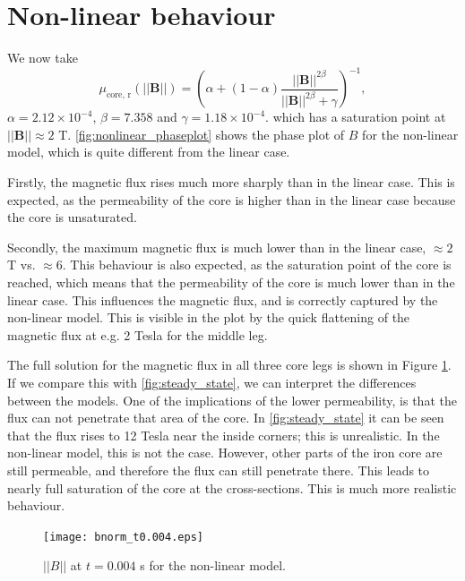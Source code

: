 \section{Non-linear behaviour}
We now take 
\begin{equation*}
\mu_{\text{core, r}}(||\textbf{B}||) = \left(\alpha + (1 - \alpha) \frac{||\textbf{B}||^{2\beta}}{||\textbf{B}||^{2\beta} + \gamma}\right)^{-1},
\end{equation*}
$\alpha = 2.12 \times 10^{-4}$, $\beta = 7.358$ and $\gamma = 1.18 \times 10^{-4}$.
which has a saturation point at $||\textbf{B}|| \approx 2$ T.
\cref{fig:nonlinear_phaseplot} shows the phase plot of $B$ for the non-linear model, which is quite different from the linear case.

Firstly, the magnetic flux rises much more sharply than in the linear case. This is expected, as the permeability of the core is higher than in the linear case because the core is unsaturated.

Secondly, the maximum magnetic flux is much lower than in the linear case, $\approx 2$T vs. $\approx 6$. This behaviour is also expected, as the saturation point of the core is reached, which means that the permeability of the core is much lower than in the linear case. This influences the magnetic flux, and is correctly captured by the non-linear model. This is visible in the plot by the quick flattening of the magnetic flux at e.g. 2 Tesla for the middle leg.

\vspace{10pt}

\noindent The full solution for the magnetic flux in all three core legs is shown in Figure \ref{fig:nonlinear_bnorm}. If we compare this with \cref{fig:steady_state}, we can interpret the differences between the models. One of the implications of the lower permeability, is that the flux can not penetrate that area of the core. In \cref{fig:steady_state} it can be seen that the flux rises to 12 Tesla near the inside corners; this is unrealistic. In the non-linear model, this is not the case. However, other parts of the iron core are still permeable, and therefore the flux can still penetrate there. This leads to nearly full saturation of the core at the cross-sections. This is much more realistic behaviour. 


\begin{figure}
    \centering
    \texttt{[image: bnorm\_t0.004.eps]}
    \caption{$||B||$ at $t = 0.004$ s for the non-linear model.}
    \label{fig:nonlinear_bnorm}
\end{figure}


